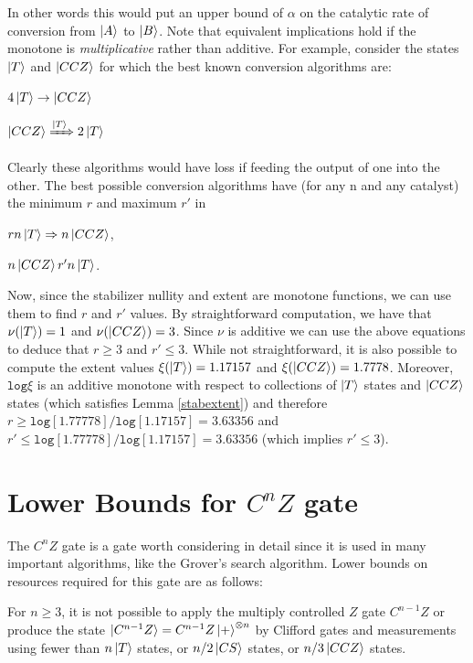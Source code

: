 \documentclass[12pt]{dalthesis}
\begin{document}
In other words this would put an upper bound of $\alpha$ on the catalytic rate of conversion from $\ket{A}$ to $\ket{B}$. Note that equivalent implications hold if the monotone is \textit{multiplicative} rather than additive.
For example, consider the states $\ket{T}$ and $\ket{CCZ}$ for which the best known conversion algorithms are:
\begin{center}
$4\ket{T} \rightarrow \ket{CCZ}$
\end{center}
\begin{center}
$\ket{CCZ} \xRightarrow{\ket{T}} 2\ket{T}$
\end{center}
Clearly these algorithms would have loss if feeding the output of one into the other. The best possible conversion algorithms have (for any n and any catalyst) the minimum $r$ and maximum $r'$ in 
\begin{center}
$rn\ket{T} \Rightarrow n\ket{CCZ}$,
\end{center}
\begin{center}
$n\ket{CCZ} r'n\ket{T}$.
\end{center}

Now, since the stabilizer nullity and extent are monotone functions, we can use them to find $r$ and $r'$ values. By straightforward computation, we have that $\nu (\ket{T}) = 1$ and $\nu(\ket{CCZ}) = 3$. Since $\nu$ is additive we can use the above equations to deduce that $r \geq 3$ and $r' \leq 3$. While not straightforward, it is also possible to compute the extent values $\xi (\ket{T}) = 1.17157$ and $\xi (\ket{CCZ}) = 1.7778$. Moreover, $\texttt{log} \xi$ is an additive monotone with respect to collections of $\ket{T}$ states and $\ket{CCZ}$ states (which satisfies Lemma \ref{stabextent}) and therefore $r \geq \texttt{log}[1.77778]/\texttt{log}[1.17157] = 3.63356$ and $r' \leq \texttt{log}[1.77778]/\texttt{log}[1.17157] = 3.63356$ (which implies $r' \leq 3$).


\section{Lower Bounds for $C^nZ$ gate}
The $C^nZ$ gate is a gate worth considering in detail since it is used in many important algorithms, like the Grover's search algorithm. Lower bounds on resources required for this gate are as follows:

\begin{proposition}
For $n \geq 3$, it is not possible to apply the multiply controlled $Z$ gate $C^{n-1}Z$ or produce the state $\ket{C^{n-1}Z} = C^{n-1}Z\ket{+}^{\otimes n}$ by Clifford gates and measurements using fewer than $n\ket{T}$ states, or $n/2 \ket{CS}$ states, or $n/3 \ket{CCZ}$ states.
\end{proposition}
\end{document}
